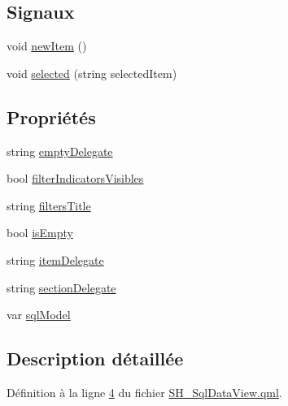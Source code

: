 \subsection*{Signaux}
\begin{DoxyCompactItemize}
\item 
void \hyperlink{classSH__SqlDataView_a8ce529551e776f86ee76d29da47f9914}{new\-Item} ()
\item 
void \hyperlink{classSH__SqlDataView_a95366e3f65b183e8c82381e90b5ddc94}{selected} (string selected\-Item)
\end{DoxyCompactItemize}
\subsection*{Propriétés}
\begin{DoxyCompactItemize}
\item 
string \hyperlink{classSH__SqlDataView_af2c0c75bb57606451699027fa74eeda2}{empty\-Delegate}
\item 
bool \hyperlink{classSH__SqlDataView_afdc0805dc2ce3af4e9ce5331a81d7e13}{filter\-Indicators\-Visibles}
\item 
string \hyperlink{classSH__SqlDataView_a96eb074075b9ba561603a081992a1cfc}{filters\-Title}
\item 
bool \hyperlink{classSH__SqlDataView_a3ceaf016d4dace986a92e2e77772bac9}{is\-Empty}
\item 
string \hyperlink{classSH__SqlDataView_a7ae6767ae8a82bd33b942c774c534a33}{item\-Delegate}
\item 
string \hyperlink{classSH__SqlDataView_a60486947b034f5fca72a2d5775ad1767}{section\-Delegate}
\item 
var \hyperlink{classSH__SqlDataView_ad538d6f1dd43a7d01c7960a74ca131dc}{sql\-Model}
\end{DoxyCompactItemize}


\subsection{Description détaillée}


Définition à la ligne \hyperlink{SH__SqlDataView_8qml_source_l00004}{4} du fichier \hyperlink{SH__SqlDataView_8qml_source}{S\-H\-\_\-\-Sql\-Data\-View.\-qml}.



